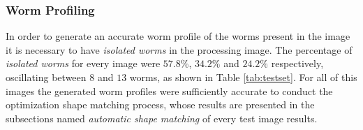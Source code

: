 \subsubsection*{Worm Profiling}

In order to generate an accurate worm profile of the worms present in the image
it is necessary to have \emph{isolated worms} in the processing image. The percentage 
of \emph{isolated worms} for every image were $57.8\%$, $34.2\%$ and $24.2\%$ respectively,
oscillating between $8$ and $13$ worms, as shown in Table \ref{tab:testset}. 
For all of this images the generated worm profiles were sufficiently accurate to
conduct the optimization shape matching process, whose results are presented in 
the subsections named \emph{automatic shape matching} of every test image results.

